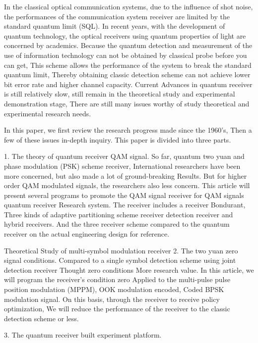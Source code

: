 \begin{enabstract}
In the classical optical communication systems, due to the influence of shot noise,
the performances of the communication system receiver are limited by the standard quantum limit (SQL).
In recent years, with the development of quantum technology, 
the optical receivers using quantum properties of light are concerned by academics.
Because the quantum detection and measurement of the use of information technology can not be obtained by classical probe before you can get,
This scheme allows the performance of the system to break the standard quantum limit,
Thereby obtaining classic detection scheme can not achieve lower bit error rate and higher channel capacity.
Current Advances in quantum receiver is still relatively slow, still remain in the theoretical study and experimental demonstration stage,
There are still many issues worthy of study theoretical and experimental research needs.


In this paper, we first review the research progress made since the 1960's,
Then a few of these issues in-depth inquiry. This paper is divided into three parts.


1. The theory of quantum receiver QAM signal.
So far, quantum two yuan and phase modulation (PSK) scheme receiver,
International researchers have been more concerned, but also made a lot of ground-breaking
Results. But for higher order QAM modulated signals, the researchers also less concern.
This article will present several programs to promote the QAM signal receiver for QAM signals quantum receiver
Research system. The receiver includes a receiver Bondurant,
Three kinds of adaptive partitioning scheme receiver detection receiver and hybrid receivers.
And the three receiver scheme compared to the quantum receiver on the actual engineering design
for reference.

Theoretical Study of multi-symbol modulation receiver 2. The two yuan zero signal conditions.
Compared to a single symbol detection scheme using joint detection receiver Thought zero conditions
More research value. In this article, we will program the receiver's condition zero
Applied to the multi-pulse pulse position modulation (MPPM), OOK modulation encoded,
Coded BPSK modulation signal. On this basis, through the receiver to receive policy optimization,
We will reduce the performance of the receiver to the classic detection scheme or less.

3. The quantum receiver built experiment platform.

\end{enabstract}
